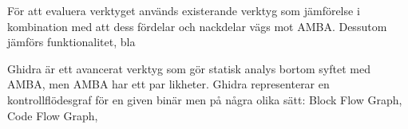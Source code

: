 


För att evaluera verktyget används existerande verktyg som jämförelse i
kombination med att dess fördelar och nackdelar vägs mot AMBA. Dessutom jämförs
funktionalitet, bla

Ghidra är ett avancerat verktyg som gör statisk analys bortom syftet med AMBA,
men AMBA har ett par likheter. Ghidra representerar en kontrollflödesgraf för
en given binär men på några olika sätt: Block Flow Graph, Code Flow Graph, 



